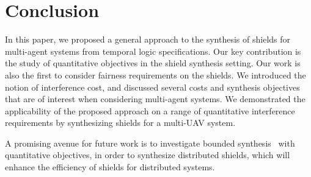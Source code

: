 \section{Conclusion}
\label{sec_concl}
In this paper, we proposed a general approach to the synthesis of shields for multi-agent systems from temporal logic specifications. Our key contribution is the study of quantitative objectives in the shield synthesis setting. Our work is also the first to consider fairness requirements on the shields. We introduced the notion of interference cost, and discussed several costs and synthesis objectives that are of interest when considering multi-agent systems. We demonstrated the applicability of the proposed approach on a range of quantitative interference requirements by synthesizing shields for a multi-UAV system.

A promising  avenue for future work is to investigate bounded synthesis~\cite{FinkbeinerS13} with quantitative objectives, in order to synthesize distributed shields, which will enhance the efficiency of shields for distributed systems.

